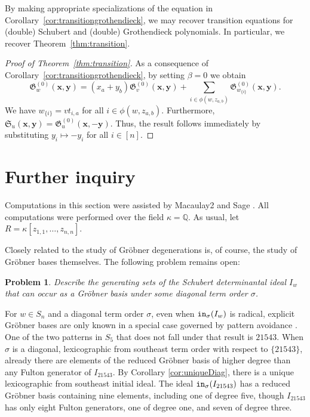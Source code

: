 \documentclass[12pt,reqno]{amsart}
\newtheorem{problem}[theorem]{Problem}
\newtheorem{Main Conjecture}[theorem]{Main Conjecture}
\theoremstyle{remark}
\theoremstyle{plain}
\newcommand{\init}{{\tt in}}
\newcommand{\QQ}{\mathbb{Q}}
\begin{document}
By making appropriate specializations of the equation in Corollary~\ref{cor:transitiongrothendieck}, we may recover transition equations for (double) Schubert and (double) Grothendieck polynomials. 
In particular, we recover Theorem~\ref{thm:transition}.

\begin{proof}[Proof of Theorem~\ref{thm:transition}]
As a consequence of Corollary~\ref{cor:transitiongrothendieck}, by setting $\beta=0$ we obtain 
\[\mathfrak G^{(0)}_w(\mathbf x,\mathbf y)=(x_a+y_b) \mathfrak G_v^{(0)}(\mathbf x,\mathbf y)+\sum_{  i\in \phi(w,z_{a,b})}\mathfrak G_{w_{\{i\}}}^{(0)}(\mathbf x,\mathbf y).\]
We have $w_{\{i\}}=vt_{i,a}$ for all $i\in \phi(w,z_{a,b}).$  Furthermore,
 $\mathfrak S_u(\mathbf x,\mathbf y)=\mathfrak G^{(0)}_u(\mathbf x,-\mathbf y)$.  Thus, the result follows immediately by substituting $y_i\mapsto -y_i$ for all $i\in [n]$.
\end{proof}


\section{Further inquiry}\label{section:furtherQuestions}

Computations in this section were assisted by Macaulay2 \cite{M2} and Sage \cite{sagemath}.  All computations were performed over the field $\kappa = \QQ$.  As usual, let $R=\kappa[z_{1,1}, \ldots, z_{n,n}]$.  

Closely related to the study of Gr\"obner degenerations is, of course, the study of Gr\"obner bases themselves.  The following problem remains open:

\begin{problem}\label{prob:Grob}
Describe the generating sets of the Schubert determinantal ideal $I_w$ that can occur as a Gr\"obner basis under some diagonal term order $\sigma$.
\end{problem}
For $w \in S_n$ and a diagonal term order $\sigma$, even when $\init_\sigma(I_w)$ is radical, explicit Gr\"obner bases are only known in a special case governed by pattern avoidance \cite{Kle}. One of the two patterns in $S_5$ that does not fall under that result is $21543$.  
When $\sigma$ is a diagonal, lexicographic from southeast term order with respect to $\{21543\}$, already there are elements of the reduced Gr\"obner basis of higher degree than any Fulton generator of $I_{21543}$.  By Corollary \ref{cor:uniqueDiag}, there is a unique lexicographic from southeast initial ideal. The ideal $\init_\sigma(I_{21543})$ has a reduced Gr\"obner basis containing nine elements, including one of degree five, though $I_{21543}$ has only eight Fulton generators, one of degree one, and seven of degree three.
\end{document}

